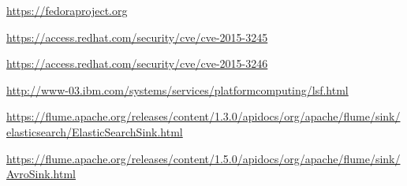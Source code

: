 \begin{thebibliography}{90}
\url{https://fedoraproject.org}

\url{https://access.redhat.com/security/cve/cve-2015-3245}

\url{https://access.redhat.com/security/cve/cve-2015-3246}

\url{http://www-03.ibm.com/systems/services/platformcomputing/lsf.html}

\url{https://flume.apache.org/releases/content/1.3.0/apidocs/org/apache/flume/sink/elasticsearch/ElasticSearchSink.html}

\url{https://flume.apache.org/releases/content/1.5.0/apidocs/org/apache/flume/sink/AvroSink.html}

\end{thebibliography}
